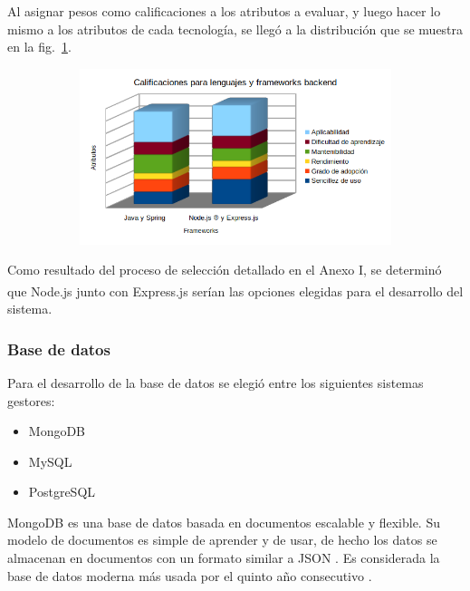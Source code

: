 \documentclass[twoside]{article}
\begin{document}
Al asignar pesos como calificaciones a los atributos a evaluar, y luego hacer lo mismo a los atributos de cada tecnología, se llegó a la distribución que se muestra en la fig.~\ref{fig:lenguajesFrameworksBackend}.
\begin{figure}[H]
	\caption{Gráfico de calificaciones para lenguajes y frameworks backend}
    \begin{subfigure}{1\textwidth}
	\includegraphics[width=1\textwidth]{calificaciones para lenguajes y frameworks backend.png}
    \end{subfigure}
	\label{fig:lenguajesFrameworksBackend}
\end{figure}
\vspace{-1.0\baselineskip}
Como resultado del proceso de selección detallado en el Anexo I, se determinó que Node.js\textsuperscript{\textregistered} junto con Express.js serían las opciones elegidas para el desarrollo del sistema.
\subsubsection{Base de datos}
Para el desarrollo de la base de datos se elegió entre los siguientes sistemas gestores:
\begin{itemize}
    \item MongoDB
    \item MySQL
    \item PostgreSQL
\end{itemize}
MongoDB es una base de datos basada en documentos escalable y flexible. Su modelo de documentos es simple de aprender y de usar, de hecho los datos se almacenan en documentos con un formato similar a JSON \parencite{whatIsMongoDBOfficial}. Es considerada la base de datos moderna más usada por el quinto año consecutivo \parencite{mongoOfficialHome}.
\end{document}
